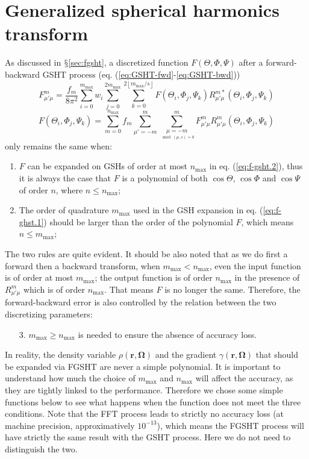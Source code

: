 \section{Generalized spherical harmonics transform\label{sec:gsh-imp}}

As discussed in $\mathsection$\ref{sec:fgsht}, a discretized function
$F(\Theta,\Phi,\Psi)$ after a forward-backward \acs{GSHT} process
(eq. (\ref{eq:GSHT-fwd}-\ref{eq:GSHT-bwd}))
\begin{equation}
F_{\mu'\mu}^{m}=\frac{f_{m}}{8\pi^{2}}\sum_{i=0}^{m_{\mathrm{max}}}w_{i}\sum_{j=0}^{2m_{\mathrm{max}}}\sum_{k=0}^{2\left\lfloor m_{\mathrm{max}}/s\right\rfloor }F(\Theta_{i},\Phi_{j},\Psi_{k})R_{\mu'\mu}^{m*}(\Theta_{i},\Phi_{j},\Psi_{k})\label{eq:f-ghst.1}
\end{equation}
\begin{equation}
F(\Theta_{i},\Phi_{j},\Psi_{k})=\sum_{m=0}^{n_{\mathrm{max}}}f_{m}\sum_{\mu'=-m}^{m}\sum_{\underset{\mod(\mu,s)=0}{\mu=-m}}^{m}F_{\mu'\mu}^{m}R_{\mu'\mu}^{m}(\Theta_{i},\Phi_{j},\Psi_{k})\label{eq:f-gsht.2}
\end{equation}
only remains the same when:
\begin{enumerate}
\item $F$ can be expanded on \acs{GSH}s of order at most $n_{\max}$ in
eq. (\ref{eq:f-gsht.2}), thus it is always the case that $F$ is
a polynomial of both $\cos\Theta$, $\cos\Phi$ and $\cos\Psi$ of
order $n$, where $n\leq n_{\max}$; 
\item The order of quadrature $m_{\max}$ used in the \acs{GSH} expansion
in eq. (\ref{eq:f-ghst.1}) should be larger than the order of the
polynomial $F$, which means $n\leq m_{\max}$;
\end{enumerate}
The two rules are quite evident. It should be also noted that as we
do first a forward then a backward transform, when $m_{\max}<n_{\max}$,
even the input function is of order at most $m_{\max}$; the output
function is of order $n_{\mathrm{max}}$ in the presence of $R_{\mu'\mu}^{m}$
which is of order $n_{\mathrm{max}}$. That means $F$ is no longer
the same. Therefore, the forward-backward error is also controlled
by the relation between the two discretizing parameters:
\begin{enumerate}
\item [3.]$m_{\max}\geq n_{\max}$ is needed to ensure the absence of accuracy
loss.
\end{enumerate}
In reality, the density variable $\rho(\mathbf{r},\mathbf{\Omega})$
and the gradient $\gamma(\mathbf{r},\mathbf{\Omega})$ that should
be expanded via \acs{FGSHT} are never a simple polynomial. It is
important to understand how much the choice of $m_{\max}$ and $n_{\max}$
will affect the accuracy, as they are tightly linked to the performance.
Therefore we chose some simple functions below to see what happens
when the function does not meet the three conditions. Note that the
\acs{FFT} process leads to strictly no accuracy loss (at machine
precision, approximatively $10^{-13}$), which means the \acs{FGSHT}
process will have strictly the same result with the \acs{GSHT} process.
Here we do not need to distinguish the two.

